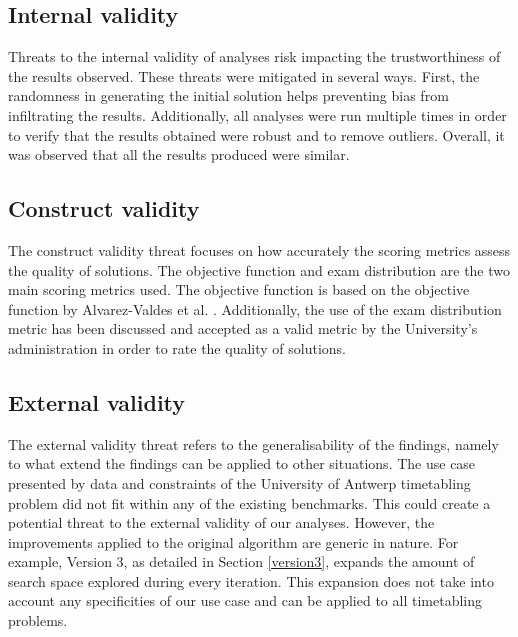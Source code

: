\subsection{Internal validity}

Threats to the internal validity of analyses risk impacting the trustworthiness of the results observed. These threats were mitigated in several ways. First, the randomness in generating the initial solution helps preventing bias from infiltrating the results. Additionally, all analyses were run multiple times in order to verify that the results obtained were robust and to remove outliers. Overall, it was observed that all the results produced  were similar.



\subsection{Construct validity}

The construct validity threat focuses on how accurately the scoring metrics assess the quality of solutions. The objective function and exam distribution are the two main scoring metrics used. The objective function is based on the objective function by Alvarez-Valdes et al. \cite{alvarez1997}. Additionally, the use of the exam distribution metric has been discussed and accepted as a valid metric by the University's administration in order to rate the quality of solutions.

\subsection{External validity}

The external validity threat refers to the generalisability of the findings, namely to what extend the findings can be applied to other situations. The use case presented by data and constraints of the University of Antwerp timetabling problem did not fit within any of the existing benchmarks. This could create a potential threat to the external validity of our analyses. However, the improvements applied to the original algorithm are generic in nature. For example, Version 3, as detailed in Section \ref{version3}, expands the amount of search space explored during every iteration. This expansion does not take into account any specificities of our use case and can be applied to all timetabling problems.

